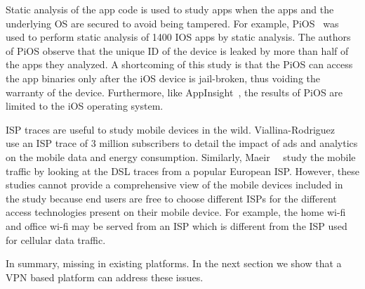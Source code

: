 Static analysis of the app code is used to study apps when the apps and the
underlying OS are secured to avoid being tampered. For example,
PiOS~\cite{egele:pios} was used to perform static analysis of 1400 IOS apps
by static analysis. The authors of PiOS observe that the unique ID of the
device is leaked by more than half of the apps they analyzed. A shortcoming
of this study is that the PiOS can access the app binaries only after the
iOS device is jail-broken, thus voiding the warranty of the device.
Furthermore, like AppInsight~\cite{ravindranath:appinsight}, the results of
PiOS are limited to the iOS operating system. 

ISP traces are useful to study mobile devices in the wild.
Viallina-Rodriguez~\etal~\cite{vallina-rod:ads} use an ISP trace of 3
million subscribers to detail the impact of ads and analytics on the mobile
data and energy consumption. Similarly, Maeir~\etal~\cite{maier:mobtraffic}
study the mobile traffic by looking at the DSL traces from a popular
European ISP. However, these studies cannot provide a comprehensive view of
the mobile devices included in the study because end users are free to
choose different ISPs for the different access technologies present on
their mobile device. For example, the home wi-fi and office wi-fi may be
served from an ISP which is different from the ISP used for cellular data
traffic. 

In summary, 
missing in existing platforms. In the next section we show that a VPN based
platform can address these issues. 






